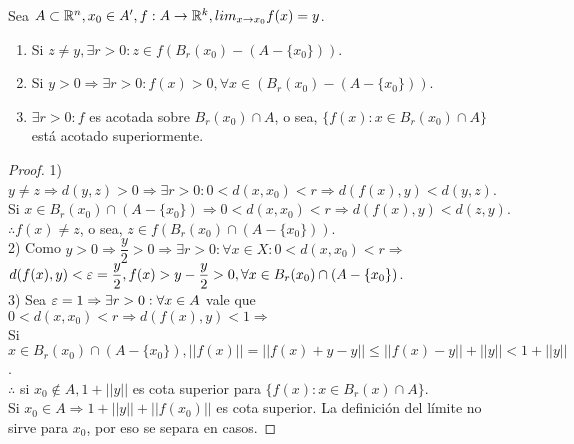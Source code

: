 \begin{prop}
  Sea $A \subset \mathbb{R}^n, x_0 \in A^{\prime}, f: A \to \mathbb{R}^k, lim_{x \to x_0} f(x) = y$.
  \begin{enumerate}
    \item Si $z \neq y, \exists r > 0 : z \in f(B_r(x_0) - (A -\{x_0\}))$.
    \item Si $y > 0 \Rightarrow \exists r > 0 : f(x) > 0, \forall x \in (B_r(x_0) - (A - \{x_0\}))$.
    \item $\exists r > 0 : f$ es acotada sobre $B_r(x_0) \cap A$, o sea, $\{f(x) : x \in B_r(x_0) \cap A\}$ está acotado superiormente.
  \end{enumerate}

  \begin{proof}
    1) $y \neq z \Rightarrow d(y, z) > 0 \Rightarrow \exists r > 0 : 0 < d(x, x_0) < r \Rightarrow d(f(x), y) < d(y, z)$. \\
    Si $x \in B_r(x_0) \cap (A - \{x_0\}) \Rightarrow 0 < d(x, x_0) < r \Rightarrow d(f(x), y) < d(z, y)$. \\
    $\therefore f(x) \neq z$, o sea, $z \in f(B_r(x_0) \cap (A - \{x_0\}))$. \\

    2) Como $y > 0 \Rightarrow \dfrac{y}{2} > 0 \Rightarrow \exists r > 0 : \forall x \in X : 0 < d(x, x_0) < r \Rightarrow$ \\
    $d(f(x), y) < \varepsilon = \dfrac{y}{2}, f(x) > y - \dfrac{y}{2} > 0, \forall x \in B_r(x_0) \cap (A - \{x_0\})$. \\

    3) Sea $\varepsilon = 1 \Rightarrow \exists r > 0 : \forall x \in A$ vale que $0 < d(x, x_0) < r \Rightarrow d(f(x), y) < 1 \Rightarrow$ \\
    Si $x \in B_r(x_0) \cap (A - \{x_0\}), ||f(x)|| = ||f(x) + y - y|| \leq ||f(x) - y|| + ||y|| < 1 + ||y||$. \\
    $\therefore$ si $x_0 \notin A, 1+||y||$ es cota superior para $\{f(x) : x \in B_r(x) \cap A\}$. \\
    Si $x_0 \in A \Rightarrow 1 + ||y|| + ||f(x_0)||$ es cota superior. La definición del límite no sirve para $x_0$, por eso se separa en casos. 
  \end{proof}
\end{prop}

